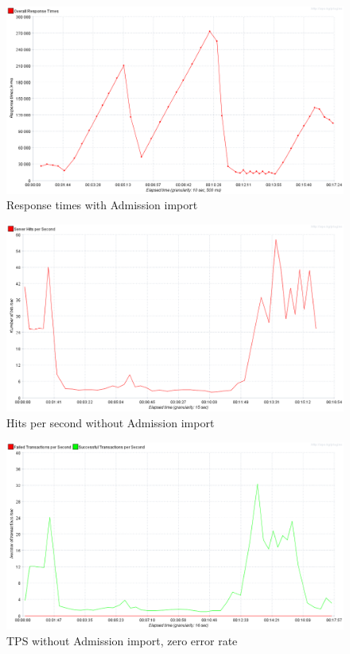 	\begin{figure}[h]
		\label{fig:jmeter:response_times_over_time_250_with_admission_import}
		\centering
		\includegraphics[width=12cm]{figures/jmeter/response_times_over_time_250_with_admission_import}
		\caption{Response times with Admission import}
	\end{figure}

	\begin{figure}[h]
		\label{fig:jmeter:hits_per_second_250_without_admission_import}
		\centering
		\includegraphics[width=12cm]{figures/jmeter/hits_per_second_250_without_admission_import}
		\caption{Hits per second without Admission import}
	\end{figure}

	\begin{figure}[h]
		\label{fig:jmeter:tps_250_without_admission_import}
		\centering
		\includegraphics[width=12cm]{figures/jmeter/tps_250_without_admission_import}
		\caption{TPS without Admission import, zero error rate}
	\end{figure}

